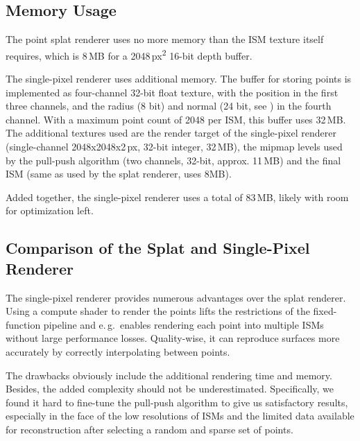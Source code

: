 

 \subsection{Memory Usage}

 The point splat renderer uses no more memory than the ISM texture itself requires, which is 8\,MB for a 2048\,px\textsuperscript{2} 16-bit depth buffer.

 The single-pixel renderer uses additional memory. The buffer for storing points is implemented as four-channel 32-bit float texture, with the position in the first three channels, and the radius (8 bit) and normal (24 bit, see \cite{Cigolle:2014:NormalPacking}) in the fourth channel. With a maximum point count of 2048 per ISM, this buffer uses 32\,MB.
 The additional textures used are the render target of the single-pixel renderer (single-channel 2048x2048x2\,px, 32-bit integer, 32\,MB), the mipmap levels used by the pull-push algorithm (two channels, 32-bit, approx. 11\,MB) and the final ISM (same as used by the splat renderer, uses 8MB).

 Added together, the single-pixel renderer uses a total of 83\,MB, likely with room for optimization left.



 \subsection{Comparison of the Splat and Single-Pixel Renderer}

 The single-pixel renderer provides numerous advantages over the splat renderer. Using a compute shader to render the points lifts the restrictions of the fixed-function pipeline and e.\,g.\ enables rendering each point into multiple ISMs without large performance losses. Quality-wise, it can reproduce surfaces more accurately by correctly interpolating between points.

 The drawbacks obviously include the additional rendering time and memory. Besides, the added complexity should not be underestimated. Specifically, we found it hard to fine-tune the pull-push algorithm to give us satisfactory results, especially in the face of the low resolutions of ISMs and the limited data available for reconstruction after selecting a random and sparse set of points.





